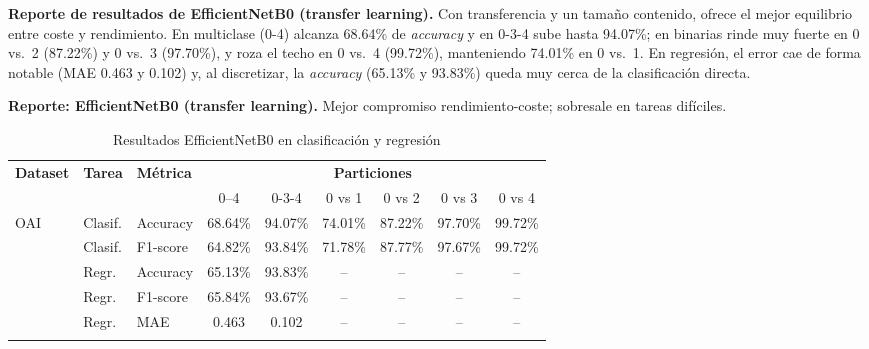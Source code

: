 \documentclass[11pt,spanish,listoffigures,listoftables]{tfgetsinf}
\begin{document}
\noindent\textbf{Reporte de resultados de EfficientNetB0 (transfer learning).} Con transferencia y un tamaño contenido, ofrece el mejor equilibrio entre coste y rendimiento. En multiclase (0-4) alcanza 68.64\% de \textit{accuracy} y en 0-3-4 sube hasta 94.07\%; en binarias rinde muy fuerte en 0 vs.\ 2 (87.22\%) y 0 vs.\ 3 (97.70\%), y roza el techo en 0 vs.\ 4 (99.72\%), manteniendo 74.01\% en 0 vs.\ 1. En regresión, el error cae de forma notable (MAE 0.463 y 0.102) y, al discretizar, la \textit{accuracy} (65.13\% y 93.83\%) queda muy cerca de la clasificación directa.

\medskip
\noindent\textbf{Reporte: EfficientNetB0 (transfer learning).} Mejor compromiso rendimiento-coste; sobresale en tareas difíciles.
\begin{table}[H]
	\centering
	\caption{Resultados EfficientNetB0 en clasificación y regresión}
	\label{tab:cnn_grande_results}
	\begin{tabular}{@{} l l l c c c c c c @{}}
		\toprule
		\textbf{Dataset} & \textbf{Tarea}                           & \textbf{Métrica}
		                 & \multicolumn{6}{c}{\textbf{Particiones}}                                                                                \\
		\cmidrule(lr){4-9}
		                 &                                          &                  & 0--4    & 0-3-4   & 0 vs 1  & 0 vs 2  & 0 vs 3  & 0 vs 4  \\
		\midrule
		\multirow{2}{*}{OAI}
		                 & Clasif.                                  & Accuracy         & 68.64\% & 94.07\% & 74.01\% & 87.22\% & 97.70\% & 99.72\% \\
		                 & Clasif.                                  & F1-score         & 64.82\% & 93.84\% & 71.78\% & 87.77\% & 97.67\% & 99.72\% \\
		\addlinespace
		\multirow{3}{*}{OAI}
		                 & Regr.                                    & Accuracy         & 65.13\% & 93.83\% & --      & --      & --      & --      \\
		                 & Regr.                                    & F1-score         & 65.84\% & 93.67\% & --      & --      & --      & --      \\
		                 & Regr.                                    & MAE              & 0.463   & 0.102   & --      & --      & --      & --      \\
		\addlinespace
	\end{tabular}
\end{table}
\end{document}
